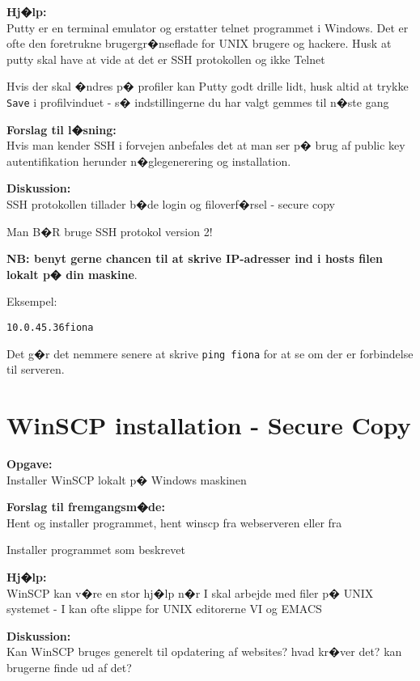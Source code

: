 \documentclass[a4paper,11pt,notitlepage]{oevelser}
\begin{document}
{\bfseries Hj�lp:}\\
Putty er en terminal emulator og erstatter telnet programmet i
Windows. Det er ofte den foretrukne brugergr�nseflade for UNIX brugere
og hackere. Husk at putty skal have at vide at det er SSH protokollen og ikke
Telnet

Hvis der skal �ndres p� profiler kan Putty godt drille lidt, husk
altid at trykke \verb+Save+ i profilvinduet - s� indstillingerne du har
valgt gemmes til n�ste gang

{\bfseries Forslag til l�sning:}\\
Hvis man kender SSH i forvejen anbefales det at man ser p�
brug af public key autentifikation herunder n�glegenerering og
installation.

{\bfseries Diskussion:}\\
SSH protokollen tillader b�de login og filoverf�rsel - secure copy

Man B�R bruge SSH protokol version 2!

{\bf NB: benyt gerne chancen til at skrive IP-adresser ind i hosts
filen lokalt p� din maskine}.

Eksempel:
\begin{alltt}
10.0.45.36    fiona
\end{alltt}

Det g�r det nemmere senere at skrive \verb+ping fiona+ for at se om
der er forbindelse til serveren.


\chapter{WinSCP installation - Secure Copy}
\label{ex:winscp-install}

{\bfseries Opgave:}\\
Installer WinSCP lokalt p� Windows maskinen

{\bfseries Forslag til fremgangsm�de:}\\
Hent og installer programmet, hent winscp fra webserveren eller fra\\

Installer programmet som beskrevet

{\bfseries Hj�lp:}\\
WinSCP kan v�re en stor hj�lp n�r I skal arbejde med filer p� UNIX
systemet - I kan ofte slippe for UNIX editorerne VI og EMACS

{\bfseries Diskussion:}\\
Kan WinSCP bruges generelt til opdatering af websites? hvad kr�ver
det? kan brugerne finde ud af det?
\end{document}
